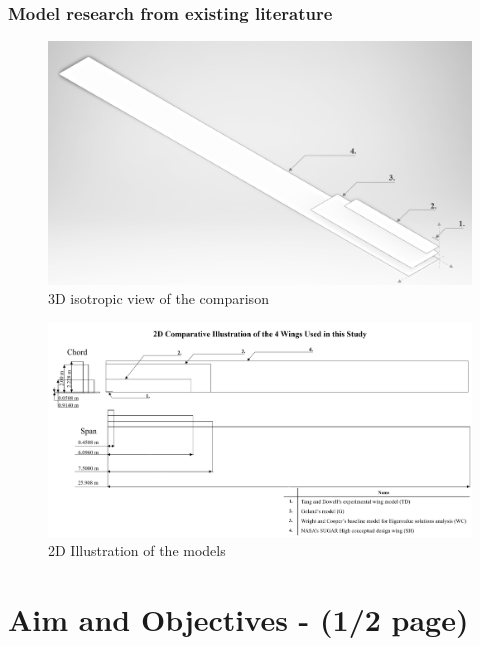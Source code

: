 \documentclass[11pt]{article}
\begin{document}
\subsubsection{Model research from existing literature}
\begin{figure}[H]
    \centering
    \includegraphics[width=.9\textwidth]{figures/iso-view.png}
    \caption{3D isotropic view of the comparison}
    \label{fig:3D-wings}
\end{figure}

\begin{figure}[H]
    \centering
    \includegraphics[width = \textwidth]{figures/para.png}
    \caption{2D Illustration of the models}
    \label{fig:2D-wings}
\end{figure}

\section{Aim and Objectives - (1/2 page)}
\end{document}
